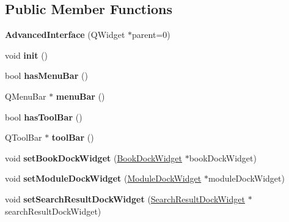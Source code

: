 \subsection*{Public Member Functions}
\begin{DoxyCompactItemize}
\item 
\hypertarget{classAdvancedInterface_a963fe7bfcfcdfddf26fde47ca756ca20}{
{\bfseries AdvancedInterface} (QWidget $\ast$parent=0)}
\label{classAdvancedInterface_a963fe7bfcfcdfddf26fde47ca756ca20}

\item 
\hypertarget{classAdvancedInterface_af15bbe65cfd404c4ac1397d9917a2683}{
void {\bfseries init} ()}
\label{classAdvancedInterface_af15bbe65cfd404c4ac1397d9917a2683}

\item 
\hypertarget{classAdvancedInterface_a24fbaf153df7f72712b675e41d688435}{
bool {\bfseries hasMenuBar} ()}
\label{classAdvancedInterface_a24fbaf153df7f72712b675e41d688435}

\item 
\hypertarget{classAdvancedInterface_a8c3ba62245dbd39375c218f1bc23ee35}{
QMenuBar $\ast$ {\bfseries menuBar} ()}
\label{classAdvancedInterface_a8c3ba62245dbd39375c218f1bc23ee35}

\item 
\hypertarget{classAdvancedInterface_a0ab3f59653aec93c386bcfa4397ace1f}{
bool {\bfseries hasToolBar} ()}
\label{classAdvancedInterface_a0ab3f59653aec93c386bcfa4397ace1f}

\item 
\hypertarget{classAdvancedInterface_a61dba62c9988504340855f7a2709ae34}{
QToolBar $\ast$ {\bfseries toolBar} ()}
\label{classAdvancedInterface_a61dba62c9988504340855f7a2709ae34}

\item 
\hypertarget{classAdvancedInterface_a2896236a735b43849fbae85f81b5b98f}{
void {\bfseries setBookDockWidget} (\hyperlink{classBookDockWidget}{BookDockWidget} $\ast$bookDockWidget)}
\label{classAdvancedInterface_a2896236a735b43849fbae85f81b5b98f}

\item 
\hypertarget{classAdvancedInterface_a3a2c178d27ec16f6a315ad4651d71186}{
void {\bfseries setModuleDockWidget} (\hyperlink{classModuleDockWidget}{ModuleDockWidget} $\ast$moduleDockWidget)}
\label{classAdvancedInterface_a3a2c178d27ec16f6a315ad4651d71186}

\item 
\hypertarget{classAdvancedInterface_abf7f5c79df92eca44ff1ae2058be3231}{
void {\bfseries setSearchResultDockWidget} (\hyperlink{classSearchResultDockWidget}{SearchResultDockWidget} $\ast$searchResultDockWidget)}
\label{classAdvancedInterface_abf7f5c79df92eca44ff1ae2058be3231}


\end{DoxyCompactItemize}
